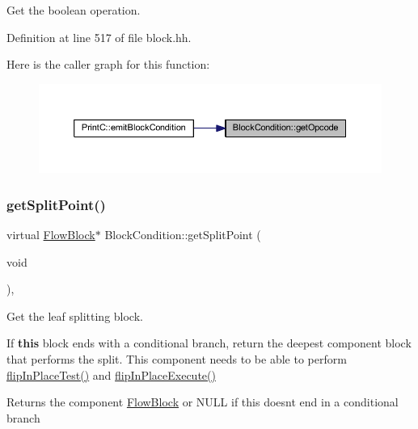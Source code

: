 Get the boolean operation. 



Definition at line 517 of file block.\+hh.

Here is the caller graph for this function\+:
\nopagebreak
\begin{figure}[H]
\begin{center}
\leavevmode
\includegraphics[width=350pt]{class_block_condition_a5dbdfcf9564708d69c63089919486db1_icgraph}
\end{center}
\end{figure}
\mbox{\label{class_block_condition_a031007ca09262646abc489c6d5d29e50}} 
\subsubsection{\texorpdfstring{getSplitPoint()}{getSplitPoint()}}
{\footnotesize\ttfamily virtual \mbox{\hyperlink{class_flow_block}{Flow\+Block}}$\ast$ Block\+Condition\+::get\+Split\+Point (\begin{DoxyParamCaption}\item[{void}]{ }\end{DoxyParamCaption})\hspace{0.3cm}{\ttfamily [inline]}, {\ttfamily [virtual]}}



Get the leaf splitting block. 

If {\bfseries{this}} block ends with a conditional branch, return the deepest component block that performs the split. This component needs to be able to perform \mbox{\hyperlink{class_block_condition_a586d47e72963c4e5f719f3673ef3743c}{flip\+In\+Place\+Test()}} and \mbox{\hyperlink{class_block_condition_a600c60c9af3b7ad9d7b8f58fa0f7ab5a}{flip\+In\+Place\+Execute()}} \begin{DoxyReturn}{Returns}
the component \mbox{\hyperlink{class_flow_block}{Flow\+Block}} or N\+U\+LL if this doesn\textquotesingle{}t end in a conditional branch 
\end{DoxyReturn}


